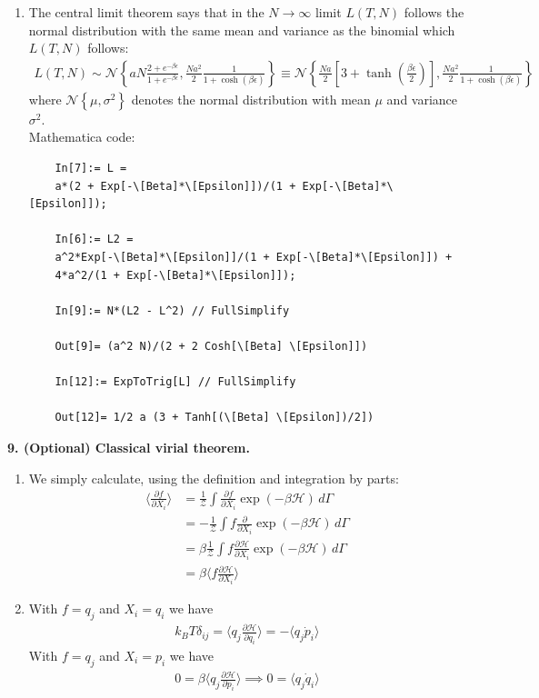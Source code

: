 \documentclass{article}
\theoremstyle{definition}
\newcommand{\p}{\partial}
\newcommand{\ham}{\mathcal{H}}
\newcommand{\be}{\beta}
\newcommand{\f}[2]{\frac{#1}{#2}}
\newcommand{\lb}{\left[}
\newcommand{\rb}{\right]}
\newcommand{\lc}{\left\{}
\newcommand{\rc}{\right\}}
\begin{document}
\begin{enumerate}[label=(\alph*)]
	\item  The central limit theorem says that in the $N\to \infty$ limit $L(T,N)$ follows the normal distribution with the same mean and variance as the binomial which $L(T,N)$ follows:
	\begin{align*}
	\boxed{L(T,N) \sim 
	\mathcal{N}\lc  aN\f{{2+e^{-\be\epsilon}}}{1+e^{-\be\epsilon}} , \f{Na^2}{2}\f{1}{1+\cosh(\be\epsilon)} \rc 
	\equiv 
	\mathcal{N}\lc \f{Na}{2}\lb 3 + \tanh(\f{\be\epsilon}{2}) \rb , \f{Na^2}{2}\f{1}{1+\cosh(\be\epsilon)}\rc }
	\end{align*}
	where $\mathcal{N}\lc \mu,\sigma^2\rc$ denotes the normal distribution with mean $\mu$ and variance $\sigma^2$.\\
	
	
	Mathematica code:
	\begin{lstlisting}
	In[7]:= L = 
	a*(2 + Exp[-\[Beta]*\[Epsilon]])/(1 + Exp[-\[Beta]*\[Epsilon]]);
	
	In[6]:= L2 = 
	a^2*Exp[-\[Beta]*\[Epsilon]]/(1 + Exp[-\[Beta]*\[Epsilon]]) + 
	4*a^2/(1 + Exp[-\[Beta]*\[Epsilon]]);
	
	In[9]:= N*(L2 - L^2) // FullSimplify
	
	Out[9]= (a^2 N)/(2 + 2 Cosh[\[Beta] \[Epsilon]])
	
	In[12]:= ExpToTrig[L] // FullSimplify
	
	Out[12]= 1/2 a (3 + Tanh[(\[Beta] \[Epsilon])/2])
	\end{lstlisting}
\end{enumerate}


\noindent \textbf{9. (Optional) Classical virial theorem.}

\begin{enumerate}[label=(\alph*)]
	\item We simply calculate, using the definition and integration by parts:
	\begin{align*}
	\bigg\langle \f{\p f}{\p X_i} \bigg\rangle 
	&= \f{1}{\mathcal{Z}}\int \f{\p f}{\p X_i}\exp(-\be \ham)\,d\Gamma\\
	&= -\f{1}{\mathcal{Z}}\int  f\f{\p}{\p X_i}\exp(-\be\ham)\,d\Gamma\\
	&= \be\f{1}{\mathcal{Z}}\int  f\f{\p \ham}{\p X_i}\exp(-\be\ham)\,d\Gamma\\
	&= \be\bigg\langle f\f{\p \ham}{\p X_i} \bigg\rangle
	\end{align*}
	
	\item With $f=q_j$ and $X_i = q_i$ we have
	\begin{align*}
	\boxed{k_B T\delta_{ij} = \bigg\langle q_j\f{\p \ham}{\p q_i} \bigg\rangle  = -\langle q_j \dot{p}_i \rangle }
	\end{align*}
	With $f = q_j$ and $X_i = p_i$ we have
	\begin{align*}
	\boxed{0 = \be\bigg\langle q_j\f{\p \ham}{\p p_i} \bigg\rangle \implies 0 = \langle q_j \dot{q}_i\rangle}
	\end{align*}
\end{enumerate}
\end{document}

